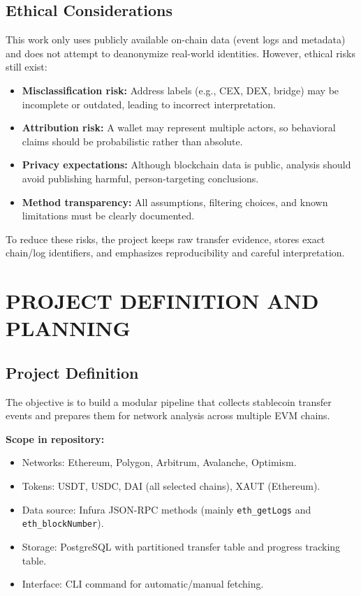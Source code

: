\documentclass[a4paper,12pt]{report}
\begin{document}
\section{Ethical Considerations}
This work only uses publicly available on-chain data (event logs and metadata) and does not attempt
to deanonymize real-world identities. However, ethical risks still exist:
\begin{itemize}
\item \textbf{Misclassification risk:} Address labels (e.g., CEX, DEX, bridge) may be incomplete or
outdated, leading to incorrect interpretation.
\item \textbf{Attribution risk:} A wallet may represent multiple actors, so behavioral claims should be
probabilistic rather than absolute.
\item \textbf{Privacy expectations:} Although blockchain data is public, analysis should avoid publishing
harmful, person-targeting conclusions.
\item \textbf{Method transparency:} All assumptions, filtering choices, and known limitations must be
clearly documented.
\end{itemize}

To reduce these risks, the project keeps raw transfer evidence, stores exact chain/log identifiers,
and emphasizes reproducibility and careful interpretation.

\chapter{PROJECT DEFINITION AND PLANNING}
\section{Project Definition}
The objective is to build a modular pipeline that collects stablecoin transfer events and prepares them
for network analysis across multiple EVM chains.

\textbf{Scope in repository:}
\begin{itemize}
\item Networks: Ethereum, Polygon, Arbitrum, Avalanche, Optimism.
\item Tokens: USDT, USDC, DAI (all selected chains), XAUT (Ethereum).
\item Data source: Infura JSON-RPC methods (mainly \texttt{eth\_getLogs} and \texttt{eth\_blockNumber}).
\item Storage: PostgreSQL with partitioned transfer table and progress tracking table.
\item Interface: CLI command for automatic/manual fetching.
\end{itemize}
\end{document}
